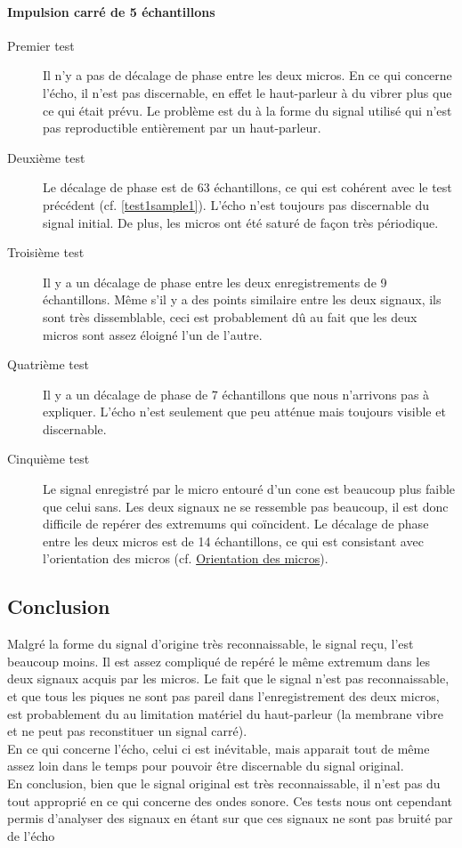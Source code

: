 \documentclass[12pt,a4paper]{report}
\begin{document}
\paragraph{Impulsion carré de 5 échantillons}
\begin{description}
\item[Premier test] Il n'y a pas de décalage de phase entre les deux micros. En ce qui concerne l'écho, il n'est pas discernable, en effet le haut-parleur à du vibrer plus que ce qui était prévu. Le problème est du à la forme du signal utilisé qui n'est pas reproductible entièrement par un haut-parleur.
\item[Deuxième test] Le décalage de phase est de 63 échantillons, ce qui est cohérent avec le test précédent (cf. \ref{test1sample1}). L'écho n'est toujours pas discernable du signal initial. De plus, les micros ont été saturé de façon très périodique.
\item[Troisième test]Il y a un décalage de phase entre les deux enregistrements de 9 échantillons. Même s'il y a des points similaire entre les deux signaux, ils sont très dissemblable, ceci est probablement dû au fait que les deux micros sont assez éloigné l'un de l'autre.
\item[Quatrième test] Il y a un décalage de phase de 7 échantillons que nous n'arrivons pas à expliquer. L'écho n'est seulement que peu atténue mais toujours visible et discernable.
\item[Cinquième test] Le signal enregistré par le micro entouré d'un cone est beaucoup plus faible que celui sans. Les deux signaux ne se ressemble pas beaucoup, il est donc difficile de repérer des extremums qui coïncident.  Le décalage de phase entre les deux micros est de 14 échantillons, ce qui est consistant avec l'orientation des micros (cf. \hyperref[orientation_micro]{Orientation des micros}).
 \end{description}

\subsection{Conclusion}
Malgré la forme du signal d'origine très reconnaissable, le signal reçu, l'est beaucoup moins. Il est assez compliqué de repéré le même extremum dans les deux signaux acquis par les micros. Le fait que le signal n'est pas reconnaissable, et que tous les piques ne sont pas pareil dans l'enregistrement des deux micros, est probablement du au limitation matériel du haut-parleur (la membrane vibre et ne peut pas reconstituer un signal carré). \\
En ce qui concerne l'écho, celui ci est inévitable, mais apparait tout de même assez loin dans le temps pour pouvoir être discernable du signal original. \\
En conclusion, bien que le signal original est très reconnaissable, il n'est pas du tout approprié en ce qui concerne des ondes sonore. Ces tests nous ont cependant permis d'analyser des signaux en étant sur que ces signaux ne sont pas bruité par de l'écho
	
\end{document}
